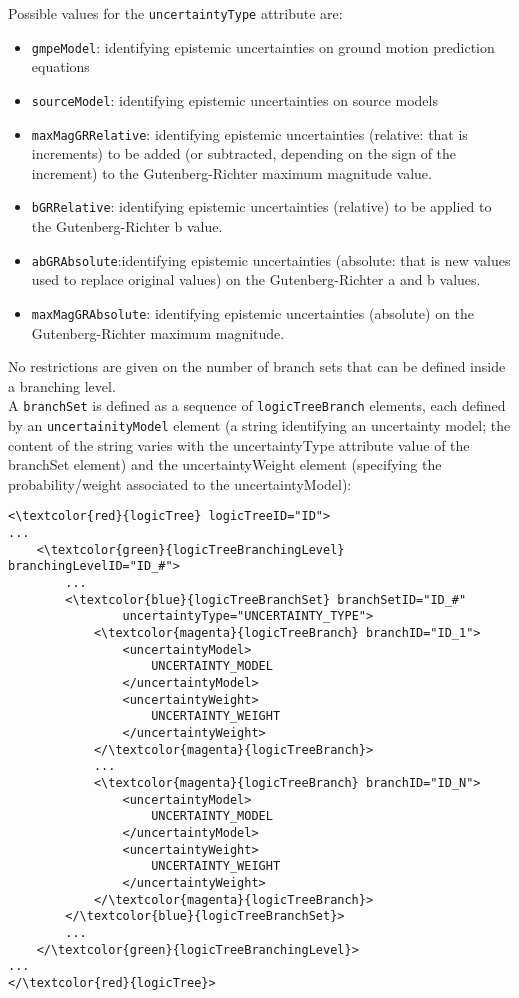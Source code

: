 Possible values for the \Verb+uncertaintyType+ attribute are:
\begin{itemize}
\item \Verb+gmpeModel+: identifying epistemic uncertainties on ground motion prediction equations
\item \Verb+sourceModel+: identifying epistemic uncertainties on source models
\item \Verb+maxMagGRRelative+: identifying epistemic uncertainties (relative: that is increments) to be added (or subtracted, depending on the sign of the increment) to the Gutenberg-Richter maximum magnitude value.
\item \Verb+bGRRelative+: identifying epistemic uncertainties (relative) to be applied to the Gutenberg-Richter b value.
\item \Verb+abGRAbsolute+:identifying epistemic uncertainties (absolute: that is new values used to replace original values) on the Gutenberg-Richter a and b values.
\item \Verb+maxMagGRAbsolute+: identifying epistemic uncertainties (absolute) on the Gutenberg-Richter maximum magnitude.
\end{itemize}
No restrictions are given on the number of branch sets that can be defined inside a branching level.\\
A \Verb+branchSet+ is defined as a sequence of  \Verb+logicTreeBranch+ elements, each defined by an \Verb+uncertainityModel+ element (a string identifying an uncertainty model; the content of the string varies with the uncertaintyType attribute value of the branchSet element) and the uncertaintyWeight element (specifying the probability/weight associated to the uncertaintyModel):
\begin{Verbatim}[frame=single, commandchars=\\\{\}]
<\textcolor{red}{logicTree} logicTreeID="ID">
...
	<\textcolor{green}{logicTreeBranchingLevel} branchingLevelID="ID_#">
		...
		<\textcolor{blue}{logicTreeBranchSet} branchSetID="ID_#"
				uncertaintyType="UNCERTAINTY_TYPE">
			<\textcolor{magenta}{logicTreeBranch} branchID="ID_1">
				<uncertaintyModel>
					UNCERTAINTY_MODEL
				</uncertaintyModel>
				<uncertaintyWeight>
					UNCERTAINTY_WEIGHT
				</uncertaintyWeight>
			</\textcolor{magenta}{logicTreeBranch}>
			...
			<\textcolor{magenta}{logicTreeBranch} branchID="ID_N">
				<uncertaintyModel>
					UNCERTAINTY_MODEL
				</uncertaintyModel>
				<uncertaintyWeight>
					UNCERTAINTY_WEIGHT
				</uncertaintyWeight>
			</\textcolor{magenta}{logicTreeBranch}>
		</\textcolor{blue}{logicTreeBranchSet}>
		...
	</\textcolor{green}{logicTreeBranchingLevel}>
...
</\textcolor{red}{logicTree}>
\end{Verbatim}
